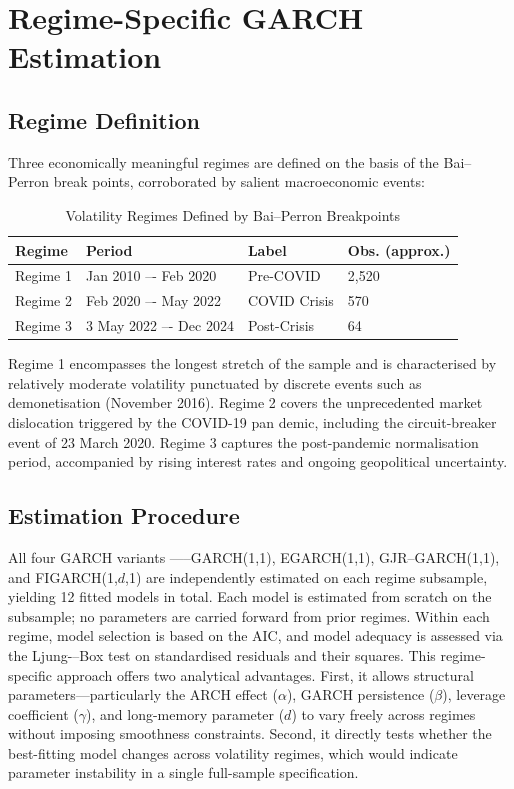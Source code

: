 \section{Regime-Specific GARCH Estimation }
\subsection{Regime Definition }
Three economically meaningful regimes are defined on the basis of the Bai–Perron break points, corroborated by salient macroeconomic events:



 



\begin{table}[h]
\centering
\caption{Volatility Regimes Defined by Bai–Perron Breakpoints}
\begin{tabular}{|l|l|l|l|}
\hline
\textbf{Regime}&\textbf{ Period } & \textbf{Label} & \textbf{Obs. (approx.) } \\
\hline
Regime 1  & Jan 2010 –- Feb 2020 & Pre-COVID  & 2,520   \\
\hline
Regime 2 & Feb 2020 –- May 2022 & COVID Crisis & 570 \\
\hline
Regime 3 & 3 May 2022 –- Dec 2024 & Post-Crisis  & 64 \\
\hline

\end{tabular}
\end{table}

Regime 1 encompasses the longest stretch of the sample and is characterised by relatively moderate volatility punctuated by discrete events such as demonetisation (November 2016). Regime 2 covers the unprecedented market dislocation triggered by the COVID-19 pan demic, including the circuit-breaker event of 23 March 2020. Regime 3 captures the post-pandemic normalisation period, accompanied by rising interest rates and ongoing geopolitical uncertainty.

\subsection{Estimation Procedure }
All four GARCH variants —--GARCH(1,1), EGARCH(1,1), GJR--GARCH(1,1), and FIGARCH(1,$d$,1) are independently estimated on each regime subsample, yielding 12 fitted models in total. Each model is estimated from scratch on the subsample; no parameters are carried forward from prior regimes. Within each regime, model selection is based on the AIC\citep{akaike1974}, and model adequacy is assessed via the Ljung-–Box test  \citep{ljungbox1978} on standardised residuals and their squares. This regime-specific approach offers two analytical advantages. First, it allows structural parameters—particularly the ARCH effect ($\alpha$), GARCH persistence ($\beta$), leverage coefficient ($\gamma$), and long-memory parameter ($d$)  to vary freely across regimes without imposing smoothness constraints. Second, it directly tests whether the best-fitting model changes across volatility regimes, which would indicate parameter instability in a single full-sample specification.


